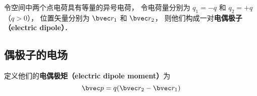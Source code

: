 


令空间中两个点电荷具有等量的异号电荷， 令电荷量分别为 $q_1 = -q$ 和 $q_2 = +q$ （$q > 0$）， 位置矢量分别为 $\bvec r_1$ 和 $\bvec r_2$， 则他们构成一对\textbf{电偶极子（electric dipole）}．

\subsection{偶极子的电场}

定义他们的\textbf{电偶极矩（electric dipole moment）}为
\begin{equation}
\bvec p = q (\bvec r_2 - \bvec r_1)
\end{equation}
